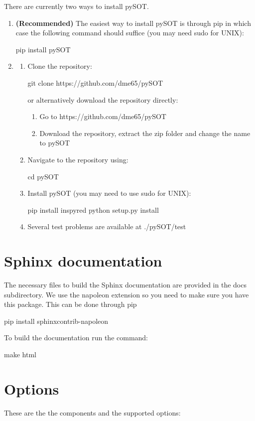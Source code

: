 \documentclass[]{article}
\begin{document}
\noindent There are currently two ways to install pySOT.
\begin{enumerate}
\item \textbf{(Recommended)} The easiest way to install pySOT is through pip in which case the following command should suffice (you may need sudo for UNIX):
\begin{python}
pip install pySOT
\end{python}
\item 
\begin{enumerate}
\item Clone the repository: 
\begin{python}
git clone https://github.com/dme65/pySOT
\end{python} 
or alternatively download the repository directly:
\begin{enumerate}
\item Go to https://github.com/dme65/pySOT
\item Download the repository, extract the zip folder and change the name to pySOT
\end{enumerate}
\item Navigate to the repository using:
\begin{python}
cd pySOT
\end{python} 
\item Install pySOT (you may need to use sudo for UNIX):
\begin{python}
pip install inspyred
python setup.py install
\end{python} 
\item Several test problems are available at ./pySOT/test
\end{enumerate}
\end{enumerate}

\section{Sphinx documentation}
The necessary files to build the Sphinx documentation are provided in the docs subdirectory. We use the napoleon extension so you need to make sure you have this package. This can be done through pip
\begin{python}
pip install sphinxcontrib-napoleon
\end{python}
To build the documentation run the command:
\begin{python}
make html
\end{python}

\section{Options}
These are the the components and the supported options:
\end{document}

